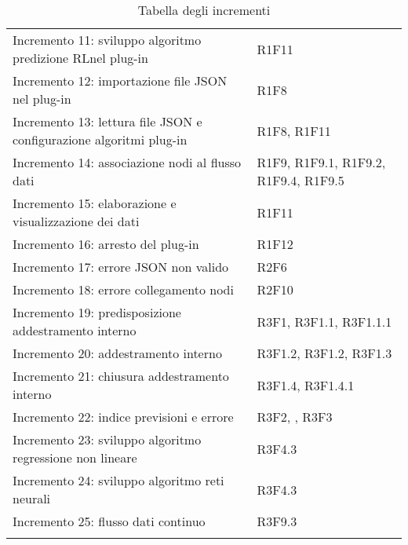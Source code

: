 \begin{longtable} {
		>{\raggedright\arraybackslash}p{85mm}
		>{\raggedleft\arraybackslash}p{40mm}
	}
	Incremento 11: sviluppo algoritmo predizione RL\glosp nel plug-in &
	R1F11 \TBstrut \\ [2mm]
	
	Incremento 12: importazione file JSON nel plug-in &
	R1F8 \TBstrut \\ [2mm]
	
	Incremento 13: lettura file JSON e configurazione algoritmi plug-in &
	R1F8, R1F11 \TBstrut \\ [2mm]
	
	Incremento 14: associazione nodi al flusso dati &
	R1F9, R1F9.1, R1F9.2, R1F9.4, R1F9.5 \TBstrut \\ [2mm]
	
	Incremento 15: elaborazione e visualizzazione dei dati &
	R1F11 \TBstrut \\ [2mm]
	
	Incremento 16: arresto del plug-in &
	R1F12 \TBstrut \\ [2mm]
	
	Incremento 17: errore JSON non valido &
	R2F6 \TBstrut \\ [2mm]
	
	Incremento 18: errore collegamento nodi &
	R2F10 \TBstrut \\ [2mm]
	
	Incremento 19: predisposizione addestramento interno &
	R3F1, R3F1.1, R3F1.1.1 \TBstrut \\ [2mm]
	
	Incremento 20: addestramento interno &
	R3F1.2, R3F1.2, R3F1.3 \TBstrut \\ [2mm]
	
	Incremento 21: chiusura addestramento interno &
	R3F1.4, R3F1.4.1 \TBstrut \\ [2mm]
	
	Incremento 22: indice previsioni e errore &
	R3F2, , R3F3 \TBstrut \\ [2mm]
	
	Incremento 23: sviluppo algoritmo regressione non lineare &
	R3F4.3 \TBstrut \\ [2mm]
	
	Incremento 24: sviluppo algoritmo reti neurali\glo &
	R3F4.3 \TBstrut \\ [2mm]
	
	Incremento 25: flusso dati continuo &
	R3F9.3 \TBstrut \\ [2mm]
	\rowcolor{white}
	\caption{Tabella degli incrementi}
\end{longtable}

